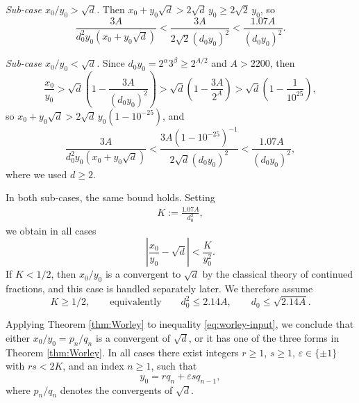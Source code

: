 \documentclass[11pt,a4paper]{article}
\numberwithin{equation}{section}
\numberwithin{table}{section}
\numberwithin{figure}{section}
\begin{document}
\medskip

\textit{Sub-case $x_0/y_0 > \sqrt{d}$.}
Then $x_0 + y_0\sqrt{d} > 2\sqrt{d}\,y_0 \geq 2\sqrt{2}\,y_0$, so
\begin{equation*}
	\frac{3A}{d_0^2 y_0(x_0+y_0\sqrt{d})}
	< \frac{3A}{2\sqrt{2}(d_0 y_0)^2}
	< \frac{1.07A}{(d_0 y_0)^2}.
\end{equation*}

\medskip

\textit{Sub-case $x_0/y_0 < \sqrt{d}$.}
Since $d_0 y_0 = 2^\alpha 3^\beta \geq 2^{A/2}$ and $A > 2200$, then
\begin{equation*}
	\frac{x_0}{y_0}
	> \sqrt{d}\left(1-\frac{3A}{(d_0 y_0)^2}\right)
	> \sqrt{d}\left(1-\frac{3A}{2^A}\right)
	> \sqrt{d}\left(1-\frac{1}{10^{25}}\right),
\end{equation*}
so $x_0 + y_0\sqrt{d} > 2\sqrt{d}\,y_0(1-10^{-25})$, and
\begin{equation*}
	\frac{3A}{d_0^2 y_0(x_0+y_0\sqrt{d})}
	< \frac{3A(1-10^{-25})^{-1}}{2\sqrt{d}(d_0 y_0)^2}
	< \frac{1.07A}{(d_0 y_0)^2},
\end{equation*}
where we used $d \geq 2$.

In both sub-cases, the same bound holds. Setting
\begin{align*}
	K := \frac{1.07A}{d_0^2},
\end{align*}
we obtain in all cases
\begin{equation}\label{eq:worley-input}
	\left|\frac{x_0}{y_0} - \sqrt{d}\right| < \frac{K}{y_0^2}.
\end{equation}
If $K < 1/2$, then $x_0/y_0$ is a convergent to $\sqrt{d}$ by the classical theory of continued fractions, and this case is handled separately later. We therefore assume
\begin{equation}\label{eq:K-half}
	K \geq 1/2, \qquad\text{equivalently}\qquad
	d_0^2 \leq 2.14A, \qquad d_0 \leq \sqrt{2.14A}.
\end{equation}

\medskip

Applying Theorem \ref{thm:Worley} to inequality \eqref{eq:worley-input}, we conclude that either $x_0/y_0 = p_n/q_n$ is a convergent of $\sqrt{d}$, or it has one of the three forms in Theorem \ref{thm:Worley}. In all cases there exist integers $r \geq 1$, $s \geq 1$, $\varepsilon \in \{\pm 1\}$ with $rs < 2K$, and an index $n \geq 1$, such that
\begin{equation}\label{eq:y0-param}
	y_0 = rq_n + \varepsilon sq_{n-1},
\end{equation}
where $p_n/q_n$ denotes the convergents of $\sqrt{d}$.
\end{document}
